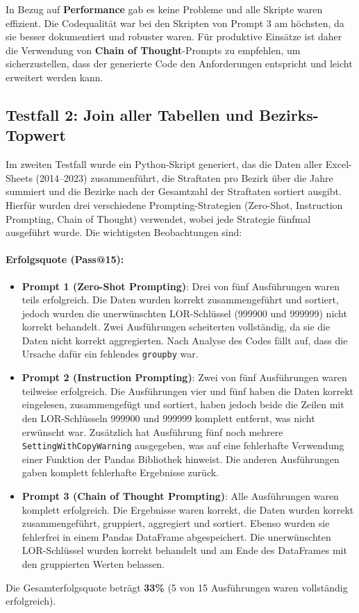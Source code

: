 \documentclass[11pt,a4paper]{article}
\begin{document}
In Bezug auf \textbf{Performance} gab es keine Probleme und alle Skripte waren effizient. Die Codequalität war bei den Skripten von Prompt 3 am höchsten, da sie besser dokumentiert und robuster waren. Für produktive Einsätze ist daher die Verwendung von \textbf{Chain of Thought}-Prompts zu empfehlen, um sicherzustellen, dass der generierte Code den Anforderungen entspricht und leicht erweitert werden kann.

\subsection{Testfall 2: Join aller Tabellen und Bezirks-Topwert}
\label{subsec:auswertung_testfall2}
Im zweiten Testfall wurde ein Python-Skript generiert, das die Daten aller Excel-Sheets (2014--2023) zusammenführt, die Straftaten pro Bezirk über die Jahre summiert und die Bezirke nach der Gesamtzahl der Straftaten sortiert ausgibt. Hierfür wurden drei verschiedene Prompting-Strategien (Zero-Shot, Instruction Prompting, Chain of Thought) verwendet, wobei jede Strategie fünfmal ausgeführt wurde. Die wichtigsten Beobachtungen sind:

\paragraph{Erfolgsquote (Pass@15):}
\begin{itemize}
    \item \textbf{Prompt 1 (Zero-Shot Prompting)}: Drei von fünf Ausführungen waren teils erfolgreich. Die Daten wurden korrekt zusammengeführt und sortiert, jedoch wurden die unerwünschten LOR-Schlüssel (999900 und 999999) nicht korrekt behandelt. Zwei Ausführungen scheiterten vollständig, da sie die Daten nicht korrekt aggregierten. Nach Analyse des Codes fällt auf, dass die Ursache dafür ein fehlendes \texttt{groupby} war.
    \item \textbf{Prompt 2 (Instruction Prompting)}: Zwei von fünf Ausführungen waren teilweise erfolgreich. Die Ausführungen vier und fünf haben die Daten korrekt eingelesen, zusammengefügt und sortiert, haben jedoch beide die Zeilen mit den LOR-Schlüsseln 999900 und 999999 komplett entfernt, was nicht erwünscht war. Zusätzlich hat Ausführung fünf noch mehrere \texttt{SettingWithCopyWarning} ausgegeben, was auf eine fehlerhafte Verwendung einer Funktion der Pandas Bibliothek hinweist. Die anderen Ausführungen gaben komplett fehlerhafte Ergebnisse zurück.
    \item \textbf{Prompt 3 (Chain of Thought Prompting)}: Alle Ausführungen waren komplett erfolgreich. Die Ergebnisse waren korrekt, die Daten wurden korrekt zusammengeführt, gruppiert, aggregiert und sortiert. Ebenso wurden sie fehlerfrei in einem Pandas DataFrame abgespeichert. Die unerwünschten LOR-Schlüssel wurden korrekt behandelt und am Ende des DataFrames mit den gruppierten Werten belassen.
\end{itemize}
Die Gesamterfolgsquote beträgt \textbf{33\%} (5 von 15 Ausführungen waren vollständig erfolgreich).
\end{document}
